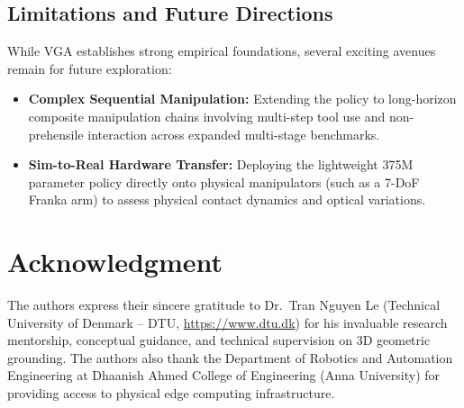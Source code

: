 \subsection{Limitations and Future Directions}
While VGA establishes strong empirical foundations, several exciting avenues remain for future exploration:
\begin{itemize}
    \item \textbf{Complex Sequential Manipulation:} Extending the policy to long-horizon composite manipulation chains involving multi-step tool use and non-prehensile interaction across expanded multi-stage benchmarks.
    \item \textbf{Sim-to-Real Hardware Transfer:} Deploying the lightweight 375M parameter policy directly onto physical manipulators (such as a 7-DoF Franka arm) to assess physical contact dynamics and optical variations.
\end{itemize}

\section*{Acknowledgment}
The authors express their sincere gratitude to Dr.~Tran Nguyen Le (Technical University of Denmark -- DTU, \url{https://www.dtu.dk}) for his invaluable research mentorship, conceptual guidance, and technical supervision on 3D geometric grounding. The authors also thank the Department of Robotics and Automation Engineering at Dhaanish Ahmed College of Engineering (Anna University) for providing access to physical edge computing infrastructure.

